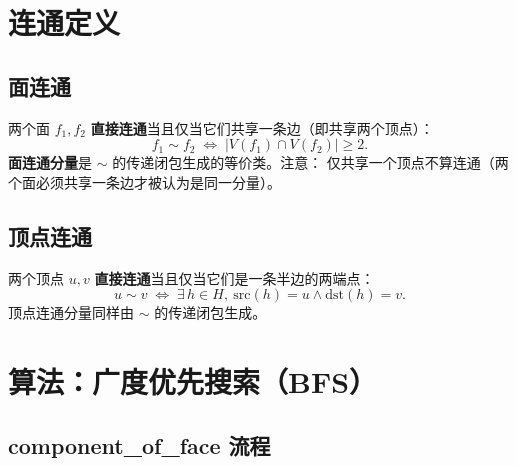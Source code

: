 \documentclass[11pt,a4paper]{article}
\begin{document}
\section{连通定义}

\subsection{面连通}

两个面 $f_1, f_2$ \textbf{直接连通}当且仅当它们共享一条边（即共享两个顶点）：
\[
  f_1 \sim f_2 \;\Longleftrightarrow\; |V(f_1) \cap V(f_2)| \ge 2.
\]
\textbf{面连通分量}是 $\sim$ 的传递闭包生成的等价类。注意：
仅共享一个顶点不算连通（两个面必须共享一条边才被认为是同一分量）。

\subsection{顶点连通}

两个顶点 $u, v$ \textbf{直接连通}当且仅当它们是一条半边的两端点：
\[
  u \sim v \;\Longleftrightarrow\; \exists\, h \in H,\ \text{src}(h)=u \wedge \text{dst}(h)=v.
\]
顶点连通分量同样由 $\sim$ 的传递闭包生成。

\section{算法：广度优先搜索（BFS）}

\subsection{component\_of\_face 流程}
\end{document}
